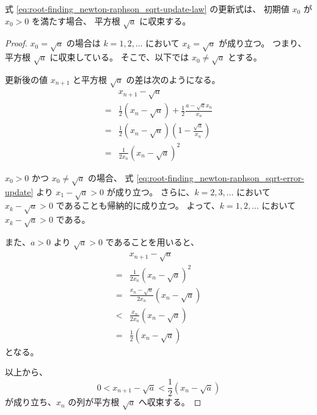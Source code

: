 \begin{theorem}
    式 \eqref{eq:root-finding_newton-raphson_sqrt-update-law} の更新式は、
    初期値 $x_0$ が $x_0 > 0$ を満たす場合、
    平方根 $\sqrt{a}$ に収束する。
\end{theorem}
\begin{proof}
    $x_0 = \sqrt{a}$ の場合は
    $k = 1, 2, \ldots$ において $x_k = \sqrt{a}$ が成り立つ。
    つまり、平方根 $\sqrt{a}$ に収束している。
    そこで、以下では $x_0 \neq \sqrt{a}$ とする。

    更新後の値 $x_{n+1}$ と平方根 $\sqrt{a}$ の差は次のようになる。
    \begin{align}
          & x_{n+1} - \sqrt{a}                                                      \\
        = & \frac{1}{2} (x_n - \sqrt{a}) + \frac{1}{2} \frac{a - \sqrt{a} x_n}{x_n} \\
        = & \frac{1}{2} (x_n - \sqrt{a}) \left(1 - \frac{\sqrt{a}}{x_n}\right)      \\
        = & \frac{1}{2x_n} (x_n - \sqrt{a})^2
        \label{eq:root-finding_newton-raphson_sqrt-error-update}
    \end{align}

    $x_0 > 0$ かつ $x_0 \neq \sqrt{a}$ の場合、
    式 \eqref{eq:root-finding_newton-raphson_sqrt-error-update} より
    $x_1 - \sqrt{a} > 0$ が成り立つ。
    さらに、$k = 2, 3, \ldots$ において $x_k - \sqrt{a} > 0$ であることも帰納的に成り立つ。
    よって、$k = 1, 2, \ldots$ において $x_k - \sqrt{a} > 0$ である。

    また、$a > 0$ より $\sqrt{a} > 0$ であることを用いると、
    \begin{align}
          & x_{n+1} - \sqrt{a}                           \\
        = & \frac{1}{2x_n} (x_n - \sqrt{a})^2            \\
        = & \frac{x_n - \sqrt{a}}{2x_n} (x_n - \sqrt{a}) \\
        < & \frac{x_n}{2x_n} (x_n - \sqrt{a})            \\
        = & \frac{1}{2} (x_n - \sqrt{a})
    \end{align}
    となる。

    以上から、
    \begin{equation}
        0 < x_{n+1} - \sqrt{a} < \frac{1}{2} (x_n - \sqrt{a})
    \end{equation}
    が成り立ち、$x_n$ の列が平方根 $\sqrt{a}$ へ収束する。
\end{proof}
